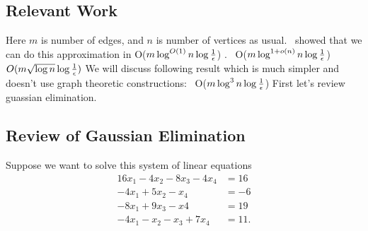 \documentclass[11pt]{article}
\begin{document}
\subsection{Relevant Work}
Here $m$ is number of edges, and $n$ is number of vertices as usual.~\cite{SpielmanT04} showed that we can do this approximation in O($m \log ^ {O(1)}{n} \log {\frac {1}{\epsilon}}$) .\newline
[KMP' 11]~\cite{KoutisMP11} O($m \log^{1+o( n )} n \log {\frac{1}{\epsilon}}$)\newline
[Cohen et al. `14]~\cite{CohenKMPPRX14}  $O( m \sqrt {\log n} \log {\frac{1}{\epsilon}})$\newline
We will discuss following result which is much simpler and doesn't use graph theoretic constructions:~\cite{KyngS16} O($m \log^3 n \log {\frac{1}{\epsilon}}$)\newline
 First let's review guassian elimination.
\subsection{ Review of Gaussian Elimination}
Suppose we want to solve this system of linear equations
\begin{align*}
16x_1 - 4x_2 -8x_3 -4x_4 &= 16 \\
-4x_1 + 5x_2           - x_4 &= -6 \\
-8x_1             + 9x_3  -x4 &= 19 \\
-4x_1 -x_2  - x_3 +7x_4 &= 11.
\end{align*}
\end{document}
